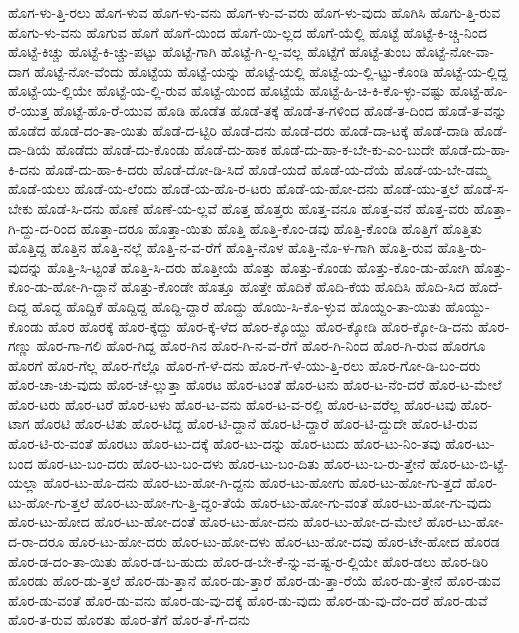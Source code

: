{ಹೊಗ-ಳು-ತ್ತಿ-ರಲು
ಹೊಗ-ಳುವ
ಹೊಗ-ಳು-ವನು
ಹೊಗ-ಳು-ವ-ವರು
ಹೊಗ-ಳು-ವುದು
ಹೊಗಿಸಿ
ಹೊಗು-ತ್ತಿ-ರುವ
ಹೊಗು-ಳು-ವನು
ಹೊಗುವ
ಹೊಗೆ
ಹೊಗೆ-ಯಿಂದ
ಹೊಗೆ-ಯಿ-ಲ್ಲದ
ಹೊಗೆ-ಯೆಲ್ಲಿ
ಹೊಟ್ಟೆ
ಹೊಟ್ಟೆ-ಕಿ-ಚ್ಚಿ-ನಿಂದ
ಹೊಟ್ಟೆ-ಕಿಚ್ಚು
ಹೊಟ್ಟೆ-ಕಿ-ಚ್ಚು-ಪಟ್ಟು
ಹೊಟ್ಟೆ-ಗಾಗಿ
ಹೊಟ್ಟೆ-ಗಿ-ಲ್ಲ-ವಲ್ಲ
ಹೊಟ್ಟೆಗೆ
ಹೊಟ್ಟೆ-ತುಂಬ
ಹೊಟ್ಟೆ-ನೋ-ವಾ-ದಾಗ
ಹೊಟ್ಟೆ-ನೋ-ವೆಂದು
ಹೊಟ್ಟೆಯ
ಹೊಟ್ಟೆ-ಯನ್ನು
ಹೊಟ್ಟೆ-ಯಲ್ಲಿ
ಹೊಟ್ಟೆ-ಯ-ಲ್ಲಿ-ಟ್ಟು-ಕೊಂಡಿ
ಹೊಟ್ಟೆ-ಯ-ಲ್ಲಿದ್ದ
ಹೊಟ್ಟೆ-ಯ-ಲ್ಲಿಯೇ
ಹೊಟ್ಟೆ-ಯ-ಲ್ಲಿ-ರುವ
ಹೊಟ್ಟೆ-ಯಿಂದ
ಹೊಟ್ಟೆಯೆ
ಹೊಟ್ಟೆ-ಹಿ-ಚಿ-ಕಿ-ಕೊ-ಳ್ಳು-ವಷ್ಟು
ಹೊಟ್ಟೆ-ಹೊ-ರೆ-ಯುತ್ತ
ಹೊಟ್ಟೆ-ಹೊ-ರೆ-ಯುವ
ಹೊಡಿ
ಹೊಡೆತ
ಹೊಡೆ-ತಕ್ಕೆ
ಹೊಡೆ-ತ-ಗಳಿಂದ
ಹೊಡೆ-ತ-ದಿಂದ
ಹೊಡೆ-ತ-ವನ್ನು
ಹೊಡೆದ
ಹೊಡೆ-ದಂ-ತಾ-ಯಿತು
ಹೊಡೆ-ದ-ಟ್ಟಿರಿ
ಹೊಡೆ-ದನು
ಹೊಡೆ-ದರು
ಹೊಡೆ-ದಾ-ಟಕ್ಕೆ
ಹೊಡೆ-ದಾಡಿ
ಹೊಡೆ-ದಾ-ಡಿಯೆ
ಹೊಡೆದು
ಹೊಡೆ-ದು-ಕೊಂಡು
ಹೊಡೆ-ದು-ಹಾಕ
ಹೊಡೆ-ದು-ಹಾ-ಕ-ಬೇ-ಕು-ಎಂ-ಬುದೇ
ಹೊಡೆ-ದು-ಹಾ-ಕಿ-ದನು
ಹೊಡೆ-ದು-ಹಾ-ಕಿ-ದರು
ಹೊಡೆ-ದೋ-ಡಿ-ಸಿದೆ
ಹೊಡೆ-ಯದೆ
ಹೊಡೆ-ಯ-ದೆಯೆ
ಹೊಡೆ-ಯ-ಬೇ-ಡಮ್ಮ
ಹೊಡೆ-ಯಲು
ಹೊಡೆ-ಯ-ಲೆಂದು
ಹೊಡೆ-ಯ-ಹೊ-ರ-ಟರು
ಹೊಡೆ-ಯ-ಹೋ-ದನು
ಹೊಡೆ-ಯು-ತ್ತಲೆ
ಹೊಡೆ-ಸ-ಬೇಕು
ಹೊಡೆ-ಸಿ-ದನು
ಹೊಣೆ
ಹೊಣೆ-ಯ-ಲ್ಲವೆ
ಹೊತ್ತ
ಹೊತ್ತರು
ಹೊತ್ತ-ವನೂ
ಹೊತ್ತ-ವನೆ
ಹೊತ್ತ-ವರು
ಹೊತ್ತಾ-ಗಿ-ದ್ದು-ದ-ರಿಂದ
ಹೊತ್ತಾ-ದರೂ
ಹೊತ್ತಾ-ಯಿತು
ಹೊತ್ತಿ
ಹೊತ್ತಿ-ಕೊಂ-ಡವು
ಹೊತ್ತಿ-ಕೊಂಡಿ
ಹೊತ್ತಿಗೆ
ಹೊತ್ತಿತು
ಹೊತ್ತಿದ್ದ
ಹೊತ್ತಿನ
ಹೊತ್ತಿ-ನಲ್ಲೆ
ಹೊತ್ತಿ-ನ-ವ-ರೆಗೆ
ಹೊತ್ತಿ-ನೊಳ
ಹೊತ್ತಿ-ನೊ-ಳ-ಗಾಗಿ
ಹೊತ್ತಿ-ರುವ
ಹೊತ್ತಿ-ರು-ವುದನ್ನು
ಹೊತ್ತಿ-ಸಿ-ಟ್ಟಂತೆ
ಹೊತ್ತಿ-ಸಿ-ದರು
ಹೊತ್ತೀಯೆ
ಹೊತ್ತು
ಹೊತ್ತು-ಕೊಂಡು
ಹೊತ್ತು-ಕೊಂ-ಡು-ಹೋಗಿ
ಹೊತ್ತು-ಕೊಂ-ಡು-ಹೋ-ಗಿ-ದ್ದಾನೆ
ಹೊತ್ತು-ಕೊಂಡೇ
ಹೊತ್ತೂ
ಹೊತ್ತೇ
ಹೊದಿಕೆ
ಹೊದಿ-ಕೆಯ
ಹೊದಿಸಿ
ಹೊದಿ-ಸಿದ
ಹೊದೆ-ದಿದ್ದ
ಹೊದ್ದ
ಹೊದ್ದಿಕೆ
ಹೊದ್ದಿದ್ದ
ಹೊದ್ದಿ-ದ್ದಾರೆ
ಹೊದ್ದು
ಹೊಯಿ-ಸಿ-ಕೊ-ಳ್ಳುವ
ಹೊಯ್ದಂ-ತಾ-ಯಿತು
ಹೊಯ್ದು-ಕೊಂಡು
ಹೊರ
ಹೊರಕ್ಕೆ
ಹೊರ-ಕ್ಕೆದ್ದು
ಹೊರ-ಕ್ಕೆ-ಳೆದ
ಹೊರ-ಕ್ಕೊಯ್ದು
ಹೊರ-ಕ್ಕೋಡಿ
ಹೊರ-ಕ್ಕೋ-ಡಿ-ದನು
ಹೊರ-ಗಣ್ಣು
ಹೊರ-ಗಾ-ಗಲಿ
ಹೊರ-ಗಿದ್ದ
ಹೊರ-ಗಿನ
ಹೊರ-ಗಿ-ನ-ವ-ರೆಗೆ
ಹೊರ-ಗಿ-ನಿಂದ
ಹೊರ-ಗಿ-ರುವ
ಹೊರಗೂ
ಹೊರಗೆ
ಹೊರ-ಗೆಲ್ಲ
ಹೊರ-ಗೆಲ್ಲೊ
ಹೊರ-ಗೆ-ಳೆ-ದನು
ಹೊರ-ಗೆ-ಳೆ-ಯು-ತ್ತಿ-ರಲು
ಹೊರ-ಗೋ-ಡಿ-ಬಂ-ದರು
ಹೊರ-ಚಾ-ಚು-ವುದು
ಹೊರ-ಚೆ-ಲ್ಲುತ್ತಾ
ಹೊರಟ
ಹೊರ-ಟಂತೆ
ಹೊರ-ಟನು
ಹೊರ-ಟ-ನೆಂ-ದರೆ
ಹೊರ-ಟ-ಮೇಲೆ
ಹೊರ-ಟರು
ಹೊರ-ಟರೆ
ಹೊರ-ಟಳು
ಹೊರ-ಟ-ವನು
ಹೊರ-ಟ-ವ-ರಲ್ಲಿ
ಹೊರ-ಟ-ವರೆಲ್ಲ
ಹೊರ-ಟವು
ಹೊರ-ಟಾಗ
ಹೊರಟಿ
ಹೊರ-ಟಿತು
ಹೊರ-ಟಿದ್ದ
ಹೊರ-ಟಿ-ದ್ದಾನೆ
ಹೊರ-ಟಿ-ದ್ದಾರೆ
ಹೊರ-ಟಿ-ದ್ದುದೇ
ಹೊರ-ಟಿ-ರುವ
ಹೊರ-ಟಿ-ರು-ವಂತೆ
ಹೊರಟು
ಹೊರ-ಟು-ದಕ್ಕೆ
ಹೊರ-ಟು-ದನ್ನು
ಹೊರ-ಟುದು
ಹೊರ-ಟು-ನಿಂ-ತವು
ಹೊರ-ಟು-ಬಂದ
ಹೊರ-ಟು-ಬಂ-ದರು
ಹೊರ-ಟು-ಬಂ-ದಳು
ಹೊರ-ಟು-ಬಂ-ದಿತು
ಹೊರ-ಟು-ಬ-ರು-ತ್ತೇನೆ
ಹೊರ-ಟು-ಬಿ-ಟ್ಟೆ-ಯಲ್ಲಾ
ಹೊರ-ಟು-ಹೊ-ದನು
ಹೊರ-ಟು-ಹೋ-ಗಿ-ದ್ದನು
ಹೊರ-ಟು-ಹೋಗು
ಹೊರ-ಟು-ಹೋ-ಗು-ತ್ತದೆ
ಹೊರ-ಟು-ಹೋ-ಗು-ತ್ತಲೆ
ಹೊರ-ಟು-ಹೋ-ಗು-ತ್ತಿ-ದ್ದಂ-ತೆಯೆ
ಹೊರ-ಟು-ಹೋ-ಗು-ವಂತೆ
ಹೊರ-ಟು-ಹೋ-ಗು-ವುದು
ಹೊರ-ಟು-ಹೋದ
ಹೊರ-ಟು-ಹೋ-ದಂತೆ
ಹೊರ-ಟು-ಹೋ-ದನು
ಹೊರ-ಟು-ಹೋ-ದ-ಮೇಲೆ
ಹೊರ-ಟು-ಹೋ-ದ-ರಾ-ದರೂ
ಹೊರ-ಟು-ಹೋ-ದರು
ಹೊರ-ಟು-ಹೋ-ದಳು
ಹೊರ-ಟು-ಹೋ-ದವು
ಹೊರ-ಟೇ-ಹೋದ
ಹೊರಡ
ಹೊರ-ಡ-ದಂ-ತಾ-ಯಿತು
ಹೊರ-ಡ-ಬ-ಹುದು
ಹೊರ-ಡ-ಬೇ-ಕೆ-ನ್ನು-ವ-ಷ್ಟ-ರ-ಲ್ಲಿಯೇ
ಹೊರ-ಡಲು
ಹೊರ-ಡಿರಿ
ಹೊರಡು
ಹೊರ-ಡು-ತ್ತಲೆ
ಹೊರ-ಡು-ತ್ತಾನೆ
ಹೊರ-ಡು-ತ್ತಾರೆ
ಹೊರ-ಡು-ತ್ತಾ-ರೆಯೆ
ಹೊರ-ಡು-ತ್ತೇನೆ
ಹೊರ-ಡುವ
ಹೊರ-ಡು-ವಂತೆ
ಹೊರ-ಡು-ವನು
ಹೊರ-ಡು-ವು-ದಕ್ಕೆ
ಹೊರ-ಡು-ವುದು
ಹೊರ-ಡು-ವು-ದೆಂ-ದರೆ
ಹೊರ-ಡುವೆ
ಹೊರ-ತ-ರುವ
ಹೊರತು
ಹೊರ-ತೆಗೆ
ಹೊರ-ತೆ-ಗೆ-ದನು
}
